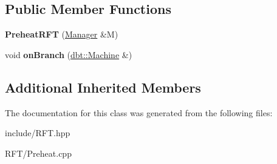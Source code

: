 \subsection*{Public Member Functions}
\begin{DoxyCompactItemize}
\item 
{\bfseries Preheat\+R\+FT} (\hyperlink{classdbt_1_1_manager}{Manager} \&M)\hypertarget{classdbt_1_1_preheat_r_f_t_a8814377937139848cae52554910d1f3d}{}\label{classdbt_1_1_preheat_r_f_t_a8814377937139848cae52554910d1f3d}

\item 
void {\bfseries on\+Branch} (\hyperlink{classdbt_1_1_machine}{dbt\+::\+Machine} \&)\hypertarget{classdbt_1_1_preheat_r_f_t_acccd0166fa52a425bc3068d955429a39}{}\label{classdbt_1_1_preheat_r_f_t_acccd0166fa52a425bc3068d955429a39}

\end{DoxyCompactItemize}
\subsection*{Additional Inherited Members}


The documentation for this class was generated from the following files\+:\begin{DoxyCompactItemize}
\item 
include/R\+F\+T.\+hpp\item 
R\+F\+T/Preheat.\+cpp\end{DoxyCompactItemize}
